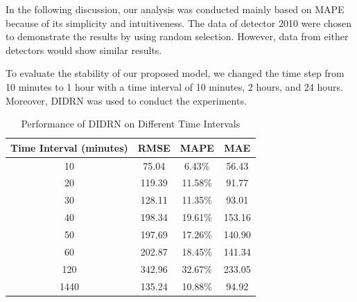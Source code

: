 \documentclass[twocolumn]{article}
\begin{document}
\par
In the following discussion, our analysis was conducted mainly based on MAPE because of its simplicity and intuitiveness. The data of detector 2010 were chosen to demonstrate the results by using random selection. However, data from either detectors would show similar results.

\par
To evaluate the stability of our proposed model, we changed the time step from 10 minutes to 1 hour with a time interval of 10 minutes, 2 hours, and 24 hours. Moreover, DIDRN was used to conduct the experiments.

\begin{table}
 \centering
    \caption{Performance of DIDRN on Different Time Intervals}
    \label{tab:3}
    \begin{tabular}{cccc}
    \toprule
    Time Interval (minutes) & RMSE & MAPE & MAE\\
    \midrule
    10 & 75.04 & 6.43\% & 56.43\\
    20 & 119.39 & 11.58\% & 91.77\\
    30 & 128.11 & 11.35\% & 93.01\\
    40 & 198.34 & 19.61\% & 153.16\\
    50 & 197.69 & 17.26\% & 140.90\\
    60 & 202.87 & 18.45\% & 141.34 \\
    120 & 342.96 & 32.67\% & 233.05 \\
    1440 & 135.24 & 10.88\% & 94.92 \\
    \bottomrule
    \end{tabular}
\end{table}
\begin{figure}
\centering
{}
\end{figure}
\end{document}
